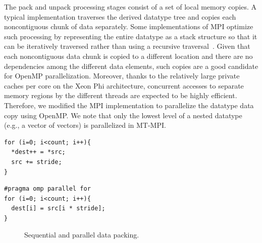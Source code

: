 The pack and unpack processing stages consist of a set of local memory
copies.  A typical implementation traverses the derived datatype tree
and copies each noncontiguous chunk of data separately.  Some
implementations of MPI optimize such processing by representing the
entire datatype as a stack structure so that it can be iteratively
traversed rather than using a recursive traversal~\cite{mpi-dataloop}.
Given that each noncontiguous data chunk is copied to a different
location and there are no dependencies among the different data
elements, such copies are a good candidate for OpenMP parallelization.
Moreover, thanks to the relatively large private caches per core on
the Xeon Phi architecture, concurrent accesses to separate memory
regions by the different threads are expected to be highly efficient.
Therefore, we modified the MPI implementation to parallelize the
datatype data copy using OpenMP.  We note that only the lowest level
of a nested datatype (e.g., a vector of vectors) is parallelized in
MT-MPI.

\newsavebox\codeSequentialPackBox
\begin{lrbox}{\codeSequentialPackBox}
\begin{lstlisting}[linewidth=0.44\columnwidth]
for (i=0; i<count; i++){
  *dest++ = *src;
  src += stride;
}
\end{lstlisting}
\end{lrbox}

\newsavebox\codeParallelPackBox
\begin{lrbox}{\codeParallelPackBox}
\begin{lstlisting}[linewidth=0.51\columnwidth]
#pragma omp parallel for
for (i=0; i<count; i++){
  dest[i] = src[i * stride];
}
\end{lstlisting}
\end{lrbox}

\begin{figure}[t]
\centering
{}
\hspace{0.2ex}
\vspace{-1.5ex}
\caption{Sequential and parallel data packing.}
\vspace{-3.5ex}
\end{figure}

